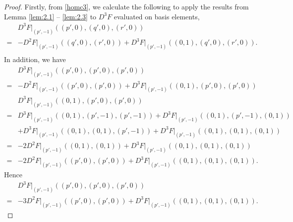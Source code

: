 \documentclass[10pt,a4paper]{amsart}
\begin{document}
\begin{proof}
Firstly, from \eqref{homc3}, we calculate the following to apply the results from Lemma \ref{lem:2.1} -- \ref{lem:2.3} to $D^3 F$ evaluated on basis elements,
\begin{equation*}
\begin{split}
     & D^3 F\Big|_{(p',-1)} ((p',0),(q',0),(r',0) ) \\
     = & - D^2 F\Big|_{(p',-1)} ((q',0), (r',0)) + D^3 F\Big|_{(p',-1)} ((0,1),(q',0),(r',0) ). \\
\end{split}
\end{equation*}
In addition, we have
\begin{equation*}
\begin{split}    
   &  D^3 F\Big|_{(p',-1)} ((p', 0), (p', 0), (p', 0)) \\
    = & - D^2 F\Big|_{(p',-1)} ((p', 0), (p', 0)) + D^3 F\Big|_{(p',-1)} ((0, 1), (p', 0), (p', 0)) \\
    & D^3 F\Big|_{(p',-1)} ((0, 1), (p', 0), (p', 0))  \\
    = & D^3 F\Big|_{(p',-1)} ((0, 1), (p', -1), (p', -1)) + D^3 F\Big|_{(p',-1)} ((0, 1), (p', -1), (0, 1)) \\
    & + D^3 F\Big|_{(p',-1)} ((0, 1), (0, 1), (p', -1)) + D^3 F\Big|_{(p',-1)} ((0, 1), (0, 1), (0, 1)) \\
    = & -2 D^2 F\Big|_{(p',-1)} ((0, 1), (0, 1)) + D^3 F\Big|_{(p',-1)} ((0, 1), (0, 1), (0, 1)) \\
    = & -2 D^2 F\Big|_{(p',-1)} ((p', 0), (p', 0)) + D^3 F\Big|_{(p',-1)} ((0, 1), (0, 1), (0, 1)).
\end{split}
\end{equation*}
Hence
\begin{equation*}
\begin{split}
    &  D^3 F\Big|_{(p',-1)} ((p', 0), (p', 0), (p', 0)) \\
    = & -3 D^2 F\Big|_{(p',-1)} ((p', 0), (p', 0)) + D^3 F\Big|_{(p',-1)} ((0, 1), (0, 1), (0, 1)).
\end{split}
\end{equation*}


\end{proof}
\end{document}
